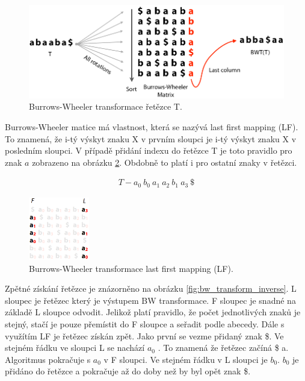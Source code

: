 \documentclass[czech,DP]{thesiskiv}
\numberwithin{equation}{section}
\begin{document}
\begin{figure}[H]		
		\centering
		\includegraphics[width=.8\textwidth]{./img/BWT_1.png}
		\caption{Burrows-Wheeler transformace řetězce T. \cite{bw_transform}}
		\label{fig:bw_transform_1}
\end{figure}

\noindent
Burrows-Wheeler matice má vlastnost, která se nazývá last first mapping (LF). To znamená, že i-tý výskyt znaku X v prvním sloupci je i-tý výskyt znaku X v posledním sloupci. V případě přidání indexu do řetězce T je toto pravidlo pro znak $a$ zobrazeno na obrázku \ref{fig:bw_transform_lf}. Obdobně to platí i pro ostatní znaky v řetězci.

\begin{align}
   \label{rerezec_t} T - a_0 \: b_0 \: a_1 \: a_2 \: b_1 \: a_3 \: \$
\end{align}



\begin{figure}[H]		
		\centering
		\includegraphics[width=100px]{./img/BWT_2.png}
		\caption{Burrows-Wheeler transformace last first mapping (LF). \cite{bw_transform}}
		\label{fig:bw_transform_lf}
\end{figure}

\noindent
Zpětné získání řetězce je znázorněno na obrázku \ref{fig:bw_transform_inverse}. L sloupec je řetězec který je výstupem BW transformace. F sloupec je snadné na základě L sloupce odvodit. Jelikož platí pravidlo, že počet jednotlivých znaků je stejný, stačí je pouze přemístit do F sloupce a seřadit podle abecedy. Dále s využítím LF je řetězec získán zpět. Jako první se vezme přidaný znak \$. Ve stejném řádku ve sloupci L se nachází $a_0$ . To znamená že řetězec začíná \$ a. Algoritmus pokračuje s $a_0$ v F sloupci. Ve stejném řádku v L sloupci je $b_0$. $b_0$ je přidáno do řetězce a pokračuje až do doby než by byl opět znak \$. 
\end{document}
